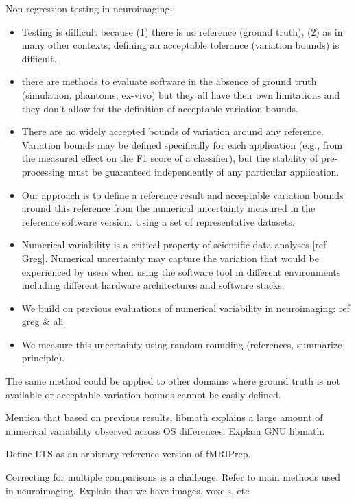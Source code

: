 \documentclass{article}
\begin{document}
Non-regression testing in neuroimaging:
\begin{itemize}
    \item Testing is difficult because (1) there is no reference (ground truth),
          (2) as in many other contexts, defining an acceptable tolerance (variation
          bounds) is difficult.
    \item there are methods to evaluate software in the absence of ground truth
          (simulation, phantoms, ex-vivo) but they all have their own limitations and
          they don't allow for the definition of acceptable variation bounds.
    \item There are no widely accepted bounds of variation around any reference.
          Variation bounds may be defined specifically for each application (e.g.,
          from the measured effect on the F1 score of a classifier), but the stability
          of pre-processing must be guaranteed independently of any particular
          application.
    \item Our approach is to define a reference result and acceptable variation
          bounds around this reference from the numerical uncertainty measured in the
          reference software version. Using a set of representative datasets.
    \item Numerical variability is a critical property of scientific data
          analyses [ref Greg]. Numerical uncertainty may capture the variation that
          would be experienced by users when using the software tool in different
          environments including different hardware architectures and software stacks.
    \item We build on previous evaluations of numerical variability in
          neuroimaging: ref greg \& ali
    \item We measure this uncertainty using random rounding (references,
          summarize principle).
\end{itemize}

The same method could be applied to other domains where ground truth is not
available or acceptable variation bounds cannot be easily defined.

Mention that based on previous results, libmath explains a large amount of
numerical variability observed across OS differences. Explain GNU libmath.

Define LTS as an arbitrary reference version of fMRIPrep.

Correcting for multiple comparisons is a challenge. Refer to main methods used
in neuroimaging. Explain that we have images, voxels, etc
\end{document}
